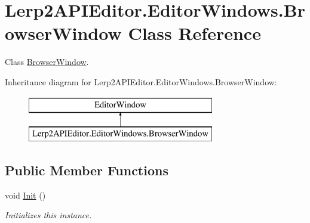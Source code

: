 \hypertarget{class_lerp2_a_p_i_editor_1_1_editor_windows_1_1_browser_window}{}\section{Lerp2\+A\+P\+I\+Editor.\+Editor\+Windows.\+Browser\+Window Class Reference}
\label{class_lerp2_a_p_i_editor_1_1_editor_windows_1_1_browser_window}


Class \hyperlink{class_lerp2_a_p_i_editor_1_1_editor_windows_1_1_browser_window}{Browser\+Window}.  


Inheritance diagram for Lerp2\+A\+P\+I\+Editor.\+Editor\+Windows.\+Browser\+Window\+:\begin{figure}[H]
\begin{center}
\leavevmode
\includegraphics[height=2.000000cm]{class_lerp2_a_p_i_editor_1_1_editor_windows_1_1_browser_window}
\end{center}
\end{figure}
\subsection*{Public Member Functions}
\begin{DoxyCompactItemize}
\item 
void \hyperlink{class_lerp2_a_p_i_editor_1_1_editor_windows_1_1_browser_window_a61c5cda8805741692922db67f1b1a788}{Init} ()
\begin{DoxyCompactList}\small\item\em Initializes this instance. \end{DoxyCompactList}\end{DoxyCompactItemize}
